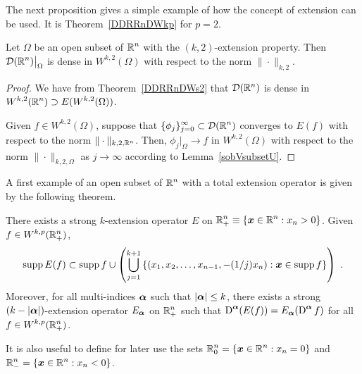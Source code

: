 The next proposition gives a simple example of how the concept of
extension can be used.  It is Theorem~\ref{DDRRnDWkp} for $p=2$.

\begin{theorem} \label{sob_dense_ext_H}
Let $\Omega$ be an open subset of $\displaystyle \mathbb{R}^n$ with the
$(k,2)$-extension property.  Then
$\displaystyle \mathcal{D}(\mathbb{R}^n)\big|_{\Omega}$ is dense in
$\displaystyle W^{k,2}(\Omega)$ with respect to the norm $\|\cdot\|_{k,2}$.
\end{theorem}

\begin{proof}
We have from Theorem~\ref{DDRRnDWs2} that $\mathcal{D}(\mathbb{R}^n)$ is dense in
$\displaystyle W^{k,2}(\mathbb{R}^n) \supset E(W^{k,2}(\Omega))$.

Given $\displaystyle f\in W^{k,2}(\Omega)$, suppose that
$\displaystyle \{\phi_j\}_{j=0}^\infty \subset \mathcal{D}(\mathbb{R}^n)$ converges
to $E(f)$ with respect to the norm $\|\cdot\|_{k,2,\mathbb{R}^n}$.  Then,
$\phi_j\big|_\Omega \rightarrow f$ in
$\displaystyle W^{k,2}(\Omega)$ with respect
to the norm $\|\cdot\|_{k,2,\Omega}$ as $j\rightarrow \infty$
according to Lemma~\ref{sobVsubsetU}.
\end{proof}

A first example of an open subset of $\displaystyle \mathbb{R}^n$ with a
total extension operator is given by the following theorem.

\begin{theorem} \label{sob_Rp_ext}
There exists a strong $k$-extension operator $E$ on
$\displaystyle \mathbb{R}^n_+ \equiv \{ {\bm{x}} \in \mathbb{R}^n : x_n>0 \}$.
Given $\displaystyle f \in W^{k,p}(\mathbb{R}^n_+)$,
\[
\operatorname{supp} E(f) \subset \operatorname{supp} f \cup 
\left( \bigcup_{j=1}^{k+1} \left\{
(x_1,x_2,\ldots,x_{n-1},-(1/j)x_n): {\bm{x}} \in \operatorname{supp} f \right\} \right) \ .
\]
Moreover, for all multi-indices ${\bm{\alpha}}$ such that $|{\bm{\alpha}}|\leq k$,
there exists a strong $(k-|{\bm{\alpha}}|)$-extension operator
$E_{{\bm{\alpha}}}$ on
$\displaystyle \mathbb{R}^n_+$ such that
$\displaystyle \operatorname{D}^{{\bm{\alpha}}} (E(f)) = E_{{\bm{\alpha}}}
(\operatorname{D}^{{\bm{\alpha}}} f)$ for all $\displaystyle f \in W^{k,p}(\mathbb{R}^n_+)$.
\end{theorem}

\begin{rmk}
It is also useful to define for later use the sets
$\displaystyle \mathbb{R}^n_0 = \{ {\bm{x}} \in \mathbb{R}^n : x_n=0 \}$ and
$\displaystyle \mathbb{R}^n_- = \{ {\bm{x}} \in \mathbb{R}^n : x_n<0 \}$.
\end{rmk}

